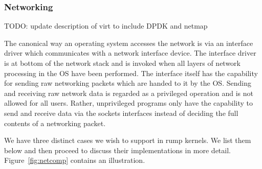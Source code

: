 \subsubsection{Networking}
\label{sect:networking}

TODO: update description of virt to include DPDK and netmap

The canonical way an operating system accesses the network is via an
interface driver which communicates with a network interface device.
The interface driver is at bottom of the network stack and is invoked
when all layers of network processing in the OS have been performed.
The interface itself has the capability for sending raw networking
packets which are handed to it by the OS.  Sending and receiving raw
network data is regarded as a privileged operation and is not allowed
for all users.  Rather, unprivileged programs only have the capability
to send and receive data via the sockets interfaces instead of deciding
the full contents of a networking packet.

We have three distinct cases we wish to support in rump kernels.
We list them below and then proceed to discuss their implementations in
more detail.  Figure~\ref{fig:netcomp} contains an illustration.

